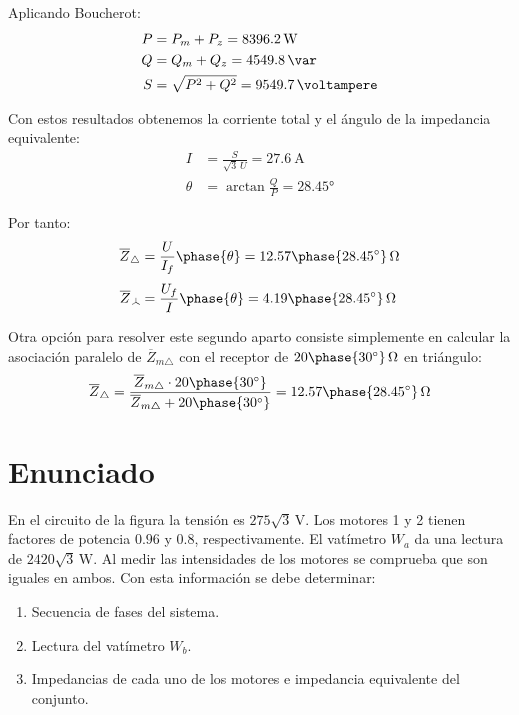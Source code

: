 \begin{enumerate}
  Aplicando Boucherot:
  \begin{align*}
    P &= P_m + P_z = \qty{8396.2}{\watt}\\
    Q &= Q_m + Q_z = \qty{4549.8}{\var}\\
    S & = \sqrt{P^2 + Q^2} = \qty{9549.7}{\voltampere}
  \end{align*}

  Con estos resultados obtenemos la corriente total y el ángulo de la impedancia equivalente:
  \begin{align*}
    I &= \frac{S}{\sqrt{3} \,U} = \qty{27.6}{\ampere}\\
    \theta &= \arctan \frac{Q}{P} = \ang{28.45}
  \end{align*}

  Por tanto:
  \begin{align*}
    \overline{Z}_{\triangle} &= \frac{U}{I_{f}}\phase{\theta} = 12.57\phase{\ang{28.45}}\,\unit{\ohm}\\[3pt]
    \overline{Z}_{\wye} &= \frac{U_f}{I}\phase{\theta} = 4.19\phase{\ang{28.45}}\,\unit{\ohm}
  \end{align*}

  Otra opción para resolver este segundo aparto consiste simplemente en calcular la asociación paralelo de $\overline{Z}_{m\triangle}$ con el receptor de $20\phase{\ang{30}}\,\si{\ohm}$ en triángulo:
  \[
    \overline{Z}_{\triangle} = \frac{\overline{Z}_{m\triangle} \cdot 20\phase{\ang{30}}}{\overline{Z}_{m\triangle} + 20\phase{\ang{30}}} = 12.57\phase{\ang{28.45}}\,\unit{\ohm}
  \]
  
\end{enumerate}

\section{Enunciado}

En el circuito de la figura la tensión es $275\sqrt{3}\,\unit{\volt}$. Los motores 1 y 2 tienen factores de potencia $0.96$ y $0.8$, respectivamente. El vatímetro $W_a$ da una lectura de $2420\sqrt{3}\,\unit{\watt}$. Al medir las intensidades de los motores se comprueba que son iguales en ambos. Con esta información se debe determinar:

\begin{enumerate}
\item Secuencia de fases del sistema.
\item Lectura del vatímetro $W_b$.
\item Impedancias de cada uno de los motores e impedancia equivalente del conjunto.
\end{enumerate}

